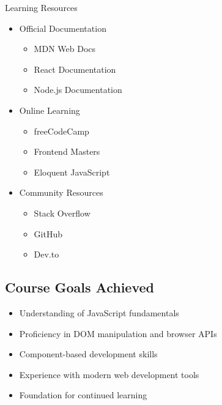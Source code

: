 \begin{corollary}{Learning Resources}
    \begin{itemize}
        \item Official Documentation
            \begin{itemize}
                \item MDN Web Docs
                \item React Documentation
                \item Node.js Documentation
            \end{itemize}
        \item Online Learning
            \begin{itemize}
                \item freeCodeCamp
                \item Frontend Masters
                \item Eloquent JavaScript
            \end{itemize}
        \item Community Resources
            \begin{itemize}
                \item Stack Overflow
                \item GitHub
                \item Dev.to
            \end{itemize}
    \end{itemize}
\end{corollary}

\subsection{Course Goals Achieved}
\begin{itemize}
    \item Understanding of JavaScript fundamentals
    \item Proficiency in DOM manipulation and browser APIs
    \item Component-based development skills
    \item Experience with modern web development tools
    \item Foundation for continued learning
\end{itemize}